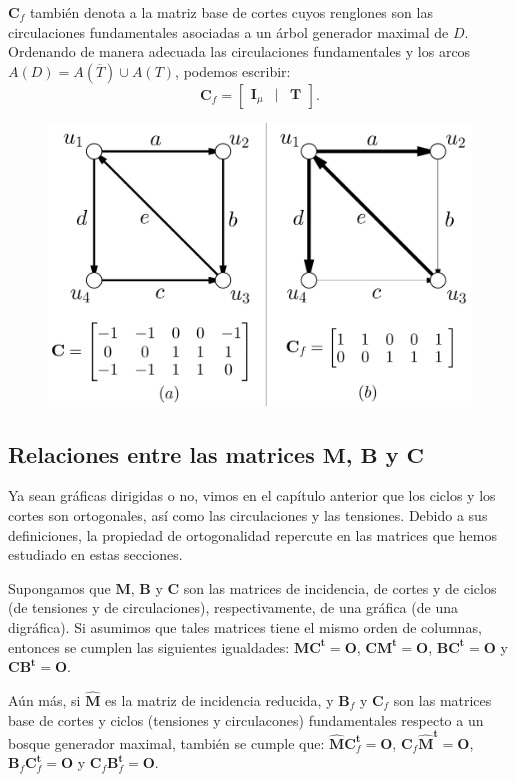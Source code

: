 $\mathbf{C}_{f}$ también denota a la matriz base de cortes cuyos renglones son las circulaciones fundamentales asociadas a un árbol generador maximal de $D$. Ordenando de manera adecuada las circulaciones fundamentales y los arcos $A(D) = A(\overline{T}) \cup A(T)$, podemos escribir:
$$
\mathbf{C}_{f} = \begin{bmatrix}
\mathbf{I}_{\mu} & | & \mathbf{T}
\end{bmatrix}.
$$
\begin{figure}[h]
    \centering
    \includegraphics[scale=0.25]{img/imgchapter4/matrizdeciclosdirigidos.jpg}
    \caption{}
    \label{fig:matrizdeciclosdirigidos}
\end{figure}

\subsection{Relaciones entre las matrices $\mathbf{M}$, $\mathbf{B}$ y $\mathbf{C}$}

Ya sean gráficas dirigidas o no, vimos en el capítulo anterior que los ciclos y los cortes son ortogonales, así como las circulaciones y las tensiones. Debido a sus definiciones, la propiedad de ortogonalidad repercute en las matrices que hemos estudiado en estas secciones.

\begin{teo}
Supongamos que $\mathbf{M}$, $\mathbf{B}$ y $\mathbf{C}$ son las matrices de incidencia, de cortes y de ciclos (de tensiones y de circulaciones), respectivamente, de una gráfica (de una digráfica). Si asumimos que tales matrices tiene el mismo orden de columnas, entonces se cumplen las siguientes igualdades: $\mathbf{M}\mathbf{C^{t}} = \mathbf{O}$, $\mathbf{C}\mathbf{M^{t}} = \mathbf{O}$, $\mathbf{B}\mathbf{C^{t}} = \mathbf{O}$ y $\mathbf{C}\mathbf{B^{t}} = \mathbf{O}$.

Aún más, si $\mathbf{\widehat{M}}$ es la matriz de incidencia reducida, y $\mathbf{B}_{f}$ y $ \mathbf{C}_{f}$ son las matrices base de cortes y ciclos (tensiones y circulacones) fundamentales respecto a un bosque generador maximal, también se cumple que: $\mathbf{\widehat{M}}\mathbf{C}_{f}^{\mathbf{t}} = \mathbf{O}$, $\mathbf{C}_{f}\mathbf{\widehat{M}^{t}} = \mathbf{O}$, $\mathbf{B}_{f}\mathbf{C}_{f}^{\mathbf{t}} = \mathbf{O}$ y $\mathbf{C}_{f}\mathbf{B}_{f}^{\mathbf{t}}= \mathbf{O}$.
\end{teo}

